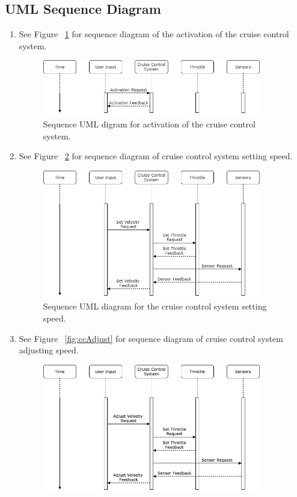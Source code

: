 \documentclass[preprint,11pt,3p]{article}
\begin{document}
\subsection{UML Sequence Diagram}
\begin{enumerate}
	\item See Figure ~\ref{fig:ccActivation} for sequence diagram of the activation of the cruise control system.
		\begin{figure}[H]
			\includegraphics[width=0.9\textwidth]{images/activation.png}
			\caption{Sequence UML digram for activation of the cruise control system.}
			\label{fig:ccActivation}
		\end{figure}
	\item See Figure ~\ref{fig:ccSet} for sequence diagram of cruise control system setting speed.
		\begin{figure}[H]
			\includegraphics[width=0.9\textwidth]{images/set.png}
			\caption{Sequence UML diagram for the cruise control system setting speed.}
			\label{fig:ccSet}
		\end{figure}
	\item See Figure ~\ref{fig:ccAdjust} for sequence diagram of cruise control system adjusting speed.
		\begin{figure}[H]
			\includegraphics[width=0.9\textwidth]{images/adjustSequence.png}

\end{figure}
\end{enumerate}
\end{document}

